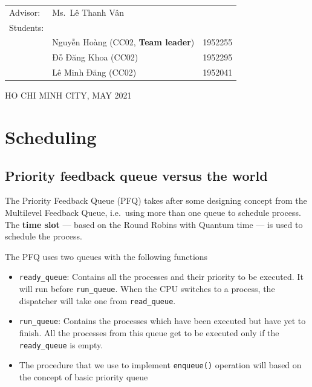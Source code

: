 \documentclass[a4paper]{article}
\numberwithin{equation}{section}
\begin{document}
\begin{titlepage}
  \vspace{3cm}

  \begin{table}[h]
    \begin{tabular}{lll}
      \hspace{1cm} Advisor:  & Ms.\ Lê Thanh Vân                                   \\
      \hspace{1cm} Students: &                                                     \\
                             & Nguyễn Hoàng (CC02, \textbf{Team leader}) & 1952255 \\
                             & Đỗ Đăng Khoa (CC02)                       & 1952295 \\
                             & Lê Minh Đăng (CC02)                       & 1952041 \\
    \end{tabular}
  \end{table}

  \begin{center}
    {\footnotesize HO CHI MINH CITY, MAY 2021}
  \end{center}
\end{titlepage}



\newpage
\tableofcontents

\newpage
\section{Scheduling}
\subsection{Priority feedback queue versus the world}
The Priority Feedback Queue (PFQ) takes after some designing concept from the Multilevel Feedback Queue, i.e.\ using more than one queue to schedule process.
The \textbf{time slot} --- based on the Round Robins with Quantum time --- is used to schedule the process.

The PFQ uses two queues with the following functions
\begin{itemize}
  \item \texttt{ready_queue}: Contains all the processes and their priority to be executed.
        It will run before \texttt{run_queue}.
        When the CPU switches to a process, the dispatcher will take one from \texttt{read_queue}.

  \item \texttt{run_queue}: Contains the processes which have been executed but have yet to finish.
        All the processes from this queue get to be executed only if the \texttt{ready_queue} is empty.

  \item The procedure that we use to implement \texttt{enqueue()} operation will based on the concept of basic priority queue
\end{itemize}
\end{document}
